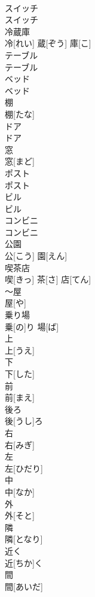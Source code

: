 \documentclass[8pt]{extreport}
\begin{document}
\begin{CJK}{UTF8}{min}
\\	スイッチ	
\\	スイッチ		
\\	冷蔵庫	
\\	冷[れい] 蔵[ぞう] 庫[こ]		
\\	テーブル	
\\	テーブル		
\\	ベッド	
\\	ベッド		
\\	棚	
\\	棚[たな]		
\\	ドア	
\\	ドア		
\\	窓	
\\	窓[まど]		
\\	ポスト	
\\	ポスト		
\\	ビル	
\\	ビル		
\\	コンビニ	
\\	コンビニ		
\\	公園	
\\	公[こう] 園[えん]		
\\	喫茶店	
\\	喫[きっ] 茶[さ] 店[てん]		
\\	～屋	
\\	屋[や]		
\\	乗り場	
\\	乗[の]り 場[ば]		
\\	上	
\\	上[うえ]		
\\	下	
\\	下[した]		
\\	前	
\\	前[まえ]		
\\	後ろ	
\\	後[うし]ろ		
\\	右	
\\	右[みぎ]		
\\	左	
\\	左[ひだり]		
\\	中	
\\	中[なか]		
\\	外	
\\	外[そと]		
\\	隣	
\\	隣[となり]		
\\	近く	
\\	近[ちか]く		
\\	間	
\\	間[あいだ]		

\end{CJK}
\end{document}
